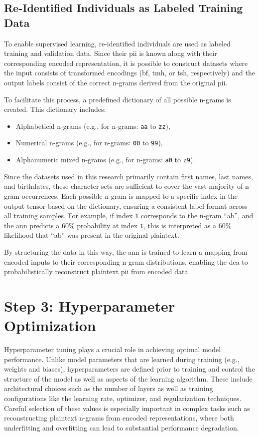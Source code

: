 \subsection{Re-Identified Individuals as Labeled Training Data}

To enable supervised learning, re-identified individuals are used as labeled training and validation data.
Since their \ac{pii} is known along with their corresponding encoded representation, it is possible to construct datasets where the input consists of transformed encodings (\ac{bf}, \ac{tmh}, or \ac{tsh}, respectively) and the output labels consist of the correct n-grams derived from the original \ac{pii}.

To facilitate this process, a predefined dictionary of all possible n-grams is created. This dictionary includes:
\begin{itemize}
   \item Alphabetical n-grams (e.g., for n-grams: \texttt{aa} to \texttt{zz}),
   \item Numerical n-grams (e.g., for n-grams: \texttt{00} to \texttt{99}),
   \item Alphanumeric mixed n-grams (e.g., for n-grams: \texttt{a0} to \texttt{z9}).
\end{itemize}

Since the datasets used in this research primarily contain first names, last names, and birthdates, these character sets are sufficient to cover the vast majority of n-gram occurrences.
Each possible n-gram is mapped to a specific index in the output tensor based on the dictionary, ensuring a consistent label format across all training samples.
For example, if index \texttt{1} corresponds to the n-gram \enquote{ab}, and the \ac{ann} predicts a 60\% probability at index \texttt{1}, this is interpreted as a 60\% likelihood that \enquote{ab} was present in the original plaintext.

By structuring the data in this way, the \ac{ann} is trained to learn a mapping from encoded inputs to their corresponding n-gram distributions, enabling the \ac{dea} to probabilistically reconstruct plaintext \ac{pii} from encoded data.

\section{Step 3: Hyperparameter Optimization}

Hyperparameter tuning plays a crucial role in achieving optimal model performance.
Unlike model parameters that are learned during training (e.g., weights and biases), hyperparameters are defined prior to training and control the structure of the model as well as aspects of the learning algorithm.
These include architectural choices such as the number of layers as well as training configurations like the learning rate, optimizer, and regularization techniques.
Careful selection of these values is especially important in complex tasks such as reconstructing plaintext n-grams from encoded representations, where both underfitting and overfitting can lead to substantial performance degradation.

